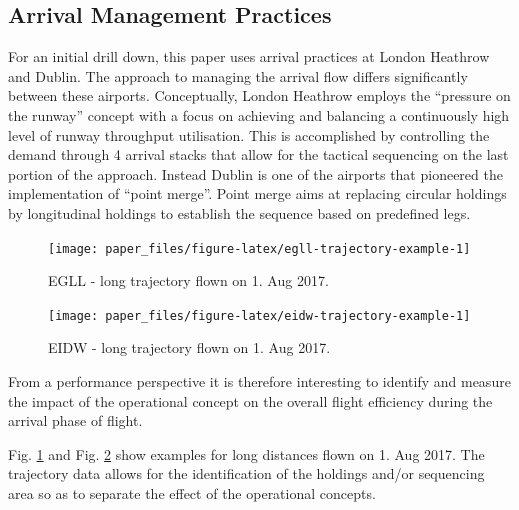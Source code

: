 \documentclass[conference,final,a4paper,]{IEEEtran}
\begin{document}
\hypertarget{arrival-management-practices}{%
\subsection{Arrival Management Practices}\label{arrival-management-practices}}

For an initial drill down, this paper uses arrival practices at London Heathrow and Dublin.
The approach to managing the arrival flow differs significantly between these airports.
Conceptually, London Heathrow employs the ``pressure on the runway'' concept with a focus on achieving and balancing a continuously high level of runway throughput utilisation.
This is accomplished by controlling the demand through 4 arrival stacks that allow for the tactical sequencing on the last portion of the approach.
Instead Dublin is one of the airports that pioneered the implementation of ``point merge''.
Point merge aims at replacing circular holdings by longitudinal holdings to establish the sequence based on predefined legs.



\begin{figure}[htb]

{\centering \texttt{[image: paper\_files/figure-latex/egll-trajectory-example-1]} 

}

\caption{EGLL - long trajectory flown on 1. Aug 2017.}\label{fig:egll-trajectory-example}
\end{figure}



\begin{figure}[bht]

{\centering \texttt{[image: paper\_files/figure-latex/eidw-trajectory-example-1]} 

}

\caption{EIDW - long trajectory flown on 1. Aug 2017.}\label{fig:eidw-trajectory-example}
\end{figure}

From a performance perspective it is therefore interesting to identify and measure the impact of the operational concept on the overall flight efficiency during the arrival phase of flight.

Fig. \ref{fig:egll-trajectory-example} and Fig. \ref{fig:eidw-trajectory-example} show examples
for long distances flown on 1. Aug 2017.
The trajectory data allows for the identification of the holdings and/or sequencing area so as
to separate the effect of the operational concepts.
\end{document}
